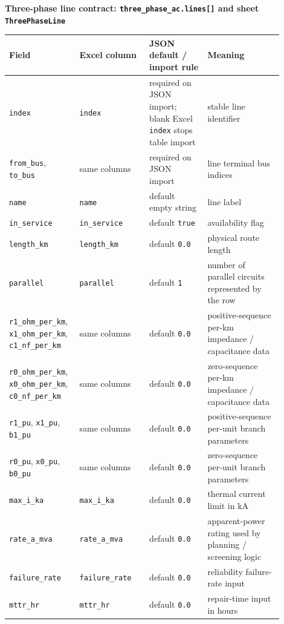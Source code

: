 \noindent\textbf{Three-phase line contract: \texttt{three\_phase\_ac.lines[]} and sheet \texttt{ThreePhaseLine}}

\begin{longtable}{L{0.20\linewidth}L{0.24\linewidth}L{0.20\linewidth}L{0.26\linewidth}}
\toprule
Field & Excel column & JSON default / import rule & Meaning \\
\midrule
\endhead
\texttt{index} & \texttt{index} & required on JSON import; blank Excel \texttt{index} stops table import & stable line identifier \\
\texttt{from\_bus}, \texttt{to\_bus} & same columns & required on JSON import & line terminal bus indices \\
\texttt{name} & \texttt{name} & default empty string & line label \\
\texttt{in\_service} & \texttt{in\_service} & default \texttt{true} & availability flag \\
\texttt{length\_km} & \texttt{length\_km} & default \texttt{0.0} & physical route length \\
\texttt{parallel} & \texttt{parallel} & default \texttt{1} & number of parallel circuits represented by the row \\
\texttt{r1\_ohm\_per\_km}, \texttt{x1\_ohm\_per\_km}, \texttt{c1\_nf\_per\_km} & same columns & default \texttt{0.0} & positive-sequence per-km impedance / capacitance data \\
\texttt{r0\_ohm\_per\_km}, \texttt{x0\_ohm\_per\_km}, \texttt{c0\_nf\_per\_km} & same columns & default \texttt{0.0} & zero-sequence per-km impedance / capacitance data \\
\texttt{r1\_pu}, \texttt{x1\_pu}, \texttt{b1\_pu} & same columns & default \texttt{0.0} & positive-sequence per-unit branch parameters \\
\texttt{r0\_pu}, \texttt{x0\_pu}, \texttt{b0\_pu} & same columns & default \texttt{0.0} & zero-sequence per-unit branch parameters \\
\texttt{max\_i\_ka} & \texttt{max\_i\_ka} & default \texttt{0.0} & thermal current limit in kA \\
\texttt{rate\_a\_mva} & \texttt{rate\_a\_mva} & default \texttt{0.0} & apparent-power rating used by planning / screening logic \\
\texttt{failure\_rate} & \texttt{failure\_rate} & default \texttt{0.0} & reliability failure-rate input \\
\texttt{mttr\_hr} & \texttt{mttr\_hr} & default \texttt{0.0} & repair-time input in hours \\
\bottomrule
\end{longtable}


